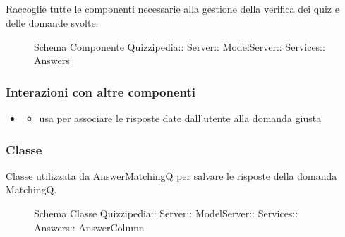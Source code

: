 \subsection{}
Raccoglie tutte le componenti necessarie alla gestione della verifica dei quiz e delle domande svolte.
\begin{figure}[H]
\centering
\noindent{}
\caption[Schema Componente Answers]{Schema Componente Quizzipedia:: Server:: ModelServer:: Services:: Answers}
\end{figure}
\subsubsection{Interazioni con altre componenti}
\begin{itemize}
\item {}
\begin{itemize}
\item usa  per associare le risposte date dall'utente alla domanda giusta
\end{itemize}
\end{itemize}
\subsubsection{Classe }
Classe utilizzata da AnswerMatchingQ per salvare le risposte della domanda MatchingQ.
\begin{figure}[H]
\centering
\noindent{}
\caption[Schema Classe AnswerColumn]{Schema Classe Quizzipedia:: Server:: ModelServer:: Services:: Answers:: AnswerColumn}
\end{figure}
